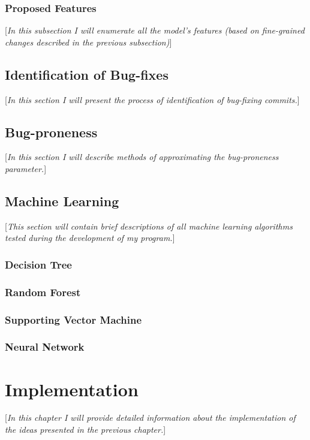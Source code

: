 \documentclass{pracamgr}
\begin{document}
\subsection{Proposed Features}
[\textit{In this subsection I will enumerate all the model's features (based on fine-grained changes described in the previous subsection)}]

\section{Identification of Bug-fixes}
[\textit{In this section I will present the process of identification of bug-fixing commits.}]

\section{Bug-proneness}
[\textit{In this section I will describe methods of approximating the bug-proneness parameter.}]

\section{Machine Learning}
[\textit{This section will contain brief descriptions of all machine learning algorithms tested during the development of my program.}]

\subsection{Decision Tree}

\subsection{Random Forest}

\subsection{Supporting Vector Machine}

\subsection{Neural Network}

\chapter{Implementation}
[\textit{In this chapter I will provide detailed information about the implementation of the ideas presented in the previous chapter.}]
\end{document}
